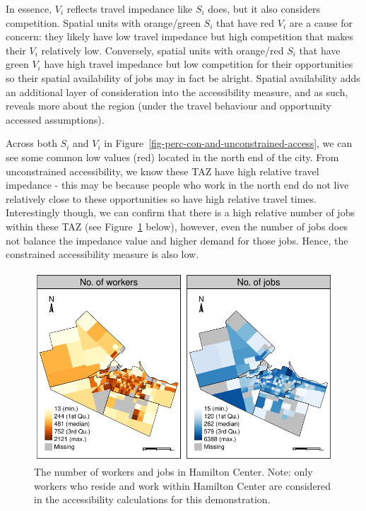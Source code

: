 \documentclass[12pt, oneside]{report}
\begin{document}
In essence, \(V_i\) reflects travel impedance like \(S_i\) does, but it
also considers competition. Spatial units with orange/green \(S_i\) that
have red \(V_i\) are a cause for concern: they likely have low travel
impedance but high competition that makes their \(V_i\) relatively low.
Conversely, spatial units with orange/red \(S_i\) that have green
\(V_i\) have high travel impedance but low competition for their
opportunities so their spatial availability of jobs may in fact be
alright. Spatial availability adds an additional layer of consideration
into the accessibility measure, and as such, reveals more about the
region (under the travel behaviour and opportunity accessed
assumptions).

Across both \(S_i\) and \(V_i\) in
Figure~\ref{fig-perc-con-and-unconstrained-access}, we can see some
common low values (red) located in the north end of the city. From
unconstrained accessibility, we know these TAZ have high relative travel
impedance - this may be because people who work in the north end do not
live relatively close to these opportunities so have high relative
travel times. Interestingly though, we can confirm that there is a high
relative number of jobs within these TAZ (see
Figure~\ref{fig-worker-job-plot} below), however, even the number of
jobs does not balance the impedance value and higher demand for those
jobs. Hence, the constrained accessibility measure is also low.

\begin{figure}

{\centering \includegraphics{tools-report_files/figure-pdf/fig-worker-job-plot-1.pdf}

}

\caption{\label{fig-worker-job-plot}The number of workers and jobs in
Hamilton Center. Note: only workers who reside and work within Hamilton
Center are considered in the accessibility calculations for this
demonstration.}

\end{figure}
\end{document}
